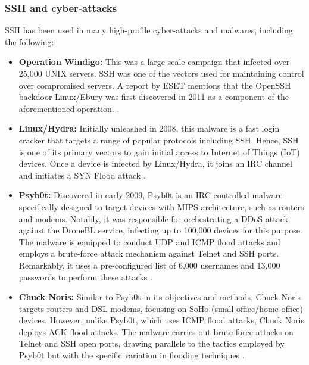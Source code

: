     \subsubsection{SSH and cyber-attacks}
    SSH has been used in many high-profile cyber-attacks and malwares, including the following:
    \begin{itemize}
        \item \textbf{Operation Windigo:} This was a large-scale campaign that infected over 25,000 UNIX servers. SSH was one of the vectors used for maintaining control over compromised servers. A report by ESET mentions that the  OpenSSH backdoor Linux/Ebury was first discovered in 2011 as a component of the aforementioned operation.  \cite{ESETWindigo14}. 
        \item \textbf{Linux/Hydra:} Initially unleashed in 2008, this malware is a fast login cracker that targets a range of popular protocols including SSH. Hence, SSH is one of its primary vectors to gain initial access to Internet of Things (IoT) devices. Once a device is infected by Linux/Hydra, it joins an IRC channel and initiates a SYN Flood attack \cite{ClassificationMalware21}.
        \item \textbf{Psyb0t:} Discovered in early 2009, Psyb0t is an IRC-controlled malware specifically designed to target devices with MIPS architecture, such as routers and modems. Notably, it was responsible for orchestrating a DDoS attack against the DroneBL service, infecting up to 100,000 devices for this purpose. The malware is equipped to conduct UDP and ICMP flood attacks and employs a brute-force attack mechanism against Telnet and SSH ports. Remarkably, it uses a pre-configured list of 6,000 usernames and 13,000 passwords to perform these attacks \cite{ClassificationMalware21}.
        \item \textbf{Chuck Noris:} Similar to Psyb0t in its objectives and methods, Chuck Noris targets routers and DSL modems, focusing on SoHo (small office/home office) devices. However, unlike Psyb0t, which uses ICMP flood attacks, Chuck Noris deploys ACK flood attacks. The malware carries out brute-force attacks on Telnet and SSH open ports, drawing parallels to the tactics employed by Psyb0t but with the specific variation in flooding techniques \cite{ClassificationMalware21}.
    \end{itemize}


